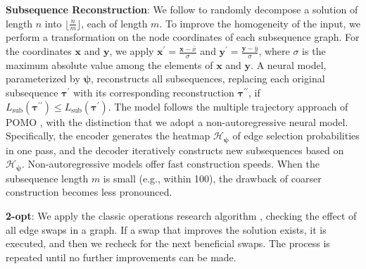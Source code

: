 \textbf{Subsequence Reconstruction}: We follow \cite{ye2024glop} to randomly decompose a solution of length $n$ into $\lfloor \frac{n}{m} \rfloor$, each of length $m$. 
To improve the homogeneity of the input, we perform a transformation on the node coordinates of each subsequence graph. 
For the coordinates $\boldsymbol{x}$ and $\boldsymbol{y}$, we apply $\boldsymbol{x}^{\prime}=\frac{\boldsymbol{x}-\bar{x}}{\sigma}$ and $\boldsymbol{y}^{\prime}=\frac{\boldsymbol{y}-\bar{y}}{\sigma}$, where $\sigma$ is the maximum absolute value among the elements of $\boldsymbol{x}$ and $\boldsymbol{y}$. 
A neural model, parameterized by $\boldsymbol{\psi}$, reconstructs all subsequences, replacing each original subsequence $\boldsymbol{\tau}^{\prime}$ with its corresponding reconstruction \textbf{$\boldsymbol{\tau}^{\prime\prime}$},
if $L_{\text{sub}}(\boldsymbol{\tau}^{\prime\prime}) \leq L_{\text{sub}}(\boldsymbol{\tau}^{\prime})$.
The model follows the multiple trajectory approach of POMO \cite{kwon2020pomo}, with the distinction that we adopt a non-autoregressive neural model. Specifically, the encoder generates the heatmap $\boldsymbol{\mathcal{H}}_{\boldsymbol{\psi}}$ of edge selection probabilities in one pass, and the decoder iteratively constructs new subsequences based on $\boldsymbol{\mathcal{H}}_{\boldsymbol{\psi}}$. 
Non-autoregressive models offer fast construction speeds. When the subsequence length $m$ is small (e.g., within 100), the drawback of coarser construction becomes less pronounced.

\textbf{2-opt}: We apply the classic operations research algorithm \cite{lin1973effective}, checking the effect of all edge swaps in a graph. If a swap that improves the solution exists, it is executed, and then we recheck for the next beneficial swaps. The process is repeated until no further improvements can be made. 


